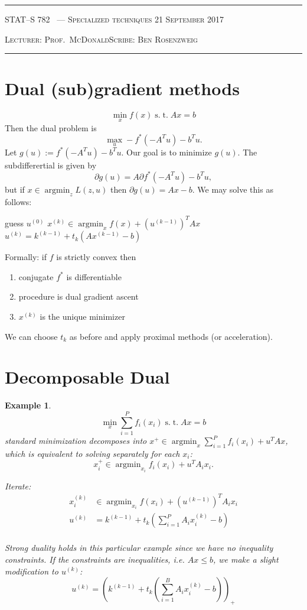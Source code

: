 \documentclass[10pt]{article}
\newcounter{lecnum}
\newtheorem{example}[ex]{Example}
\DeclareMathOperator*{\argmin}{argmin}
\newcommand{\st}{\ensuremath{\;\mathrm{s.}\;\mathrm{t.}\;}}
\newcommand{\lecturer}{Prof.\ McDonald}
\newcommand{\scribe}{Ben Rosenzweig}
\newcommand{\chtitle}{Specialized techniques}
\newcommand{\lecdate}{21 September 2017}
\begin{document}
\rule{6.5in}{1pt}

\textsc{STAT--S 782
        \hfill \thelecnum\ --- \chtitle
        \hfill \lecdate}

\textsc{Lecturer: \lecturer \hfill Scribe: \scribe}
\rule{6.5in}{1pt}

\section{Dual (sub)gradient methods}
\[\min_xf(x) \st Ax=b\]
Then the dual problem is \[\max_u -f^*(-A^Tu)-b^Tu.\]
Let $g(u):=f^*(-A^Tu)-b^Tu$. Our goal is to minimize $g(u)$.
The subdifferertial is given by
\[
\partial g(u)= A\partial f^*(-A^Tu)-b^Tu, 
\]
but if $x\in\argmin_z L(z,u)$ then $\partial g(u)={Ax-b}$.  We may solve this as follows:

\begin{algorithmic}
\STATE  guess $u^{(0)}$
\STATE $x^{(k)}\in\argmin_xf(x)+(u^{(k-1)})^TAx$
\STATE $u^{(k)} = k^{(k-1)}+t_k\left(Ax^{(k-1)}-b\right)$
\ENDFOR
\end{algorithmic}

Formally: if $f$ is strictly convex then
\begin{enumerate}
\item conjugate $f^*$ is differentiable
\item procedure is dual gradient ascent
\item $x^{(k)}$ is the unique minimizer
\end{enumerate}
We can choose $t_k$ as before and apply proximal methods (or acceleration).

\section{Decomposable Dual}
\begin{example}
  \[ \min_x \sum_{i=1}^P f_i(x_i) \st Ax=b \]
  standard minimization decomposes into $x^+\in\argmin_x\sum_{i=1}^P f_i(x_i) + u^TAx$, which is equivalent to solving separately for each $x_i$:
  \[ x^+_i\in\argmin_{x_i}f_i(x_i)+u^TA_ix_i. \]
  
  Iterate:
\begin{align*}
x_i^{(k)}&\in\argmin_{x_i}f(x_i)+(u^{(k-1)})^TA_ix_i\\ 
u^{(k)} &= k^{(k-1)}+t_k\left(\sum_{i=1}^P A_ix_i^{(k)}-b \right)\\
\end{align*}

Strong duality holds in this particular example since we have no inequality constraints.
If the constraints are inequalities, i.e. $Ax\leq b$, we make a slight modification to $u^{(k)}$:
\[
u^{(k)} = \left(k^{(k-1)}+t_k\left(\sum_{i=1}^B A_ix_i^{(k)}-b \right)\right)_+
\]
\end{example}
\end{document}
